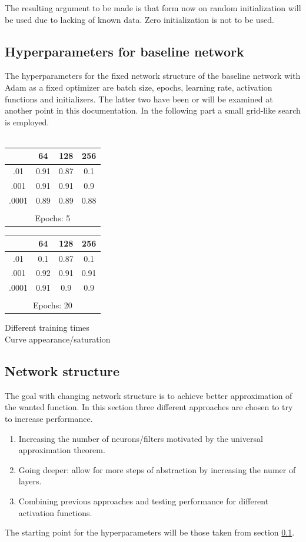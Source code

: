 \documentclass{article}
\begin{document}
\begin{multicols}{2}
The resulting argument to be made is that form now on random initialization will be used due to lacking of known data. Zero initialization is not to be used.

\subsection{Hyperparameters for baseline network}
\label{hyperparams}
The hyperparameters for the fixed network structure of the baseline network with Adam as a fixed optimizer are batch size, epochs, learning rate, activation functions and initializers. The latter two have been or will be examined at another point in this documentation. In the following part a small grid-like search is employed.\\
\\
\begin{centering}
	\begin{tabular}{c c c c}
		 & 64 & 128 & 256 \\
		\toprule[2pt]
		.01 & 0.91  & 0.87 & 0.1 \\
		\midrule[0.2pt]
		.001 & 0.91  & 0.91 & 0.9 \\
		\midrule[0.2pt]
		.0001 & 0.89  & 0.89 & 0.88 \\
		\bottomrule[2pt]\\
		\multicolumn{4}{c}{Epochs: 5}
	\end{tabular}
	\hfill
	\begin{tabular}{c c c c}
		& 64 & 128 & 256 \\
		\toprule[2pt]
		.01 & 0.1  & 0.87 & 0.1 \\
		\midrule[0.2pt]
		.001 & 0.92  & 0.91 & 0.91 \\
		\midrule[0.2pt]
		.0001 & 0.91  & 0.9 & 0.9 \\
		\bottomrule[2pt]\\
		\multicolumn{4}{c}{Epochs: 20}
	\end{tabular}
\end{centering}

Different training times\\
Curve appearance/saturation

\subsection{Network structure}
The goal with changing network structure is to achieve better approximation of the wanted function. In this section three different approaches are chosen to try to increase performance. \\
\begin{enumerate}
	\item Increasing the number of neurons/filters motivated by the universal approximation theorem.
	\item Going deeper: allow for more steps of abstraction by increasing the numer of layers.
	\item Combining previous approaches and testing performance for different activation functions.
\end{enumerate}
The starting point for the hyperparameters will be those taken from section \ref{hyperparams}.


\end{multicols}
\end{document}
